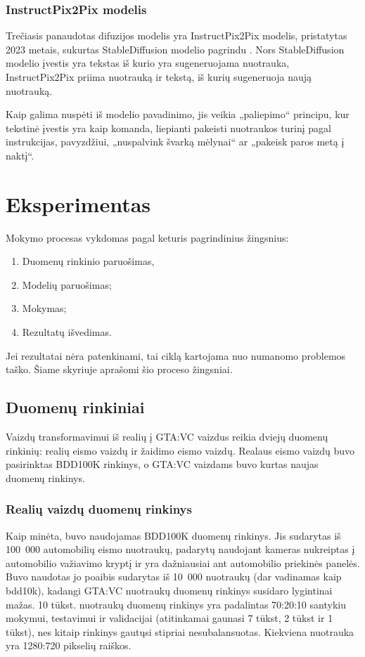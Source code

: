\documentclass{VUMIFPSbakalaurinis}
\begin{document}
        \subsubsection{InstructPix2Pix modelis}
            Trečiasis panaudotas difuzijos modelis yra InstructPix2Pix \cite{InstructPix2Pix} modelis, pristatytas 2023 metais, sukurtas StableDiffusion modelio pagrindu \cite{StableDiffusion}. Nors StableDiffusion modelio įvestis yra tekstas iš kurio yra sugeneruojama nuotrauka, InstructPix2Pix priima nuotrauką ir tekstą, iš kurių sugeneruoja naują nuotrauką.

            Kaip galima nuspėti iš modelio pavadinimo, jis veikia „paliepimo“ principu, kur tekstinė įvestis yra kaip komanda, liepianti pakeisti nuotraukos turinį pagal instrukcijas, pavyzdžiui, „nuspalvink švarką mėlynai“ ar „pakeisk paros metą į naktį“.
        
\section{Eksperimentas}
    Mokymo procesas vykdomas pagal keturis pagrindinius žingsnius: 
    \begin{enumerate}
        \item Duomenų rinkinio paruošimas,
        \item Modelių paruošimas;
        \item Mokymas;
        \item Rezultatų išvedimas.
    \end{enumerate}
    Jei rezultatai nėra patenkinami, tai ciklą kartojama nuo numanomo problemos taško. Šiame skyriuje aprašomi šio proceso žingsniai.
    \subsection{Duomenų rinkiniai}
            Vaizdų transformavimui iš realių į GTA:VC vaizdus reikia dviejų duomenų rinkinių: realių eismo vaizdų ir žaidimo eismo vaizdų. Realaus eismo vaizdų buvo pasirinktas BDD100K \cite{BDD100K}  rinkinys, o GTA:VC vaizdams buvo kurtas naujas duomenų rinkinys. 
        \subsubsection{Realių vaizdų duomenų rinkinys}
            Kaip minėta, buvo naudojamas BDD100K duomenų rinkinys. Jis sudarytas iš 100~000 automobilių eismo nuotraukų, padarytų naudojant kameras nukreiptas į automobilio važiavimo kryptį ir yra dažniausiai ant automobilio priekinės panelės. Buvo naudotas jo poaibis sudarytas iš 10~000 nuotraukų (dar vadinamas kaip bdd10k), kadangi GTA:VC nuotraukų duomenų rinkinys susidaro lygintinai mažas. 10 tūkst. nuotraukų duomenų rinkinys yra padalintas 70:20:10 santykiu mokymui, testavimui ir validacijai (atitinkamai gaunasi 7 tūkst, 2 tūkst ir 1 tūkst), nes kitaip rinkinys gautųsi stipriai nesubalansuotas. Kiekviena nuotrauka yra 1280:720 pikselių raiškos.
            
\end{document}
